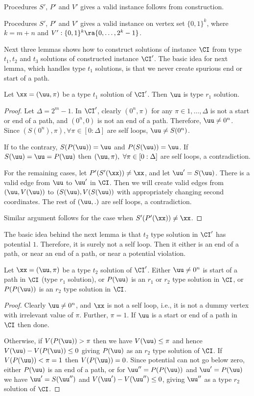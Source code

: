 Procedures $S'$, $P'$ and $V'$ gives a valid \EOML instance follows from construction.
\begin{lemma}\label{lem:p2m-valid}
Procedures $S'$, $P'$ and $V'$ gives a valid \EOML instance on vertex set $\{0,1\}^k$, where $k=m+n$ and $V':\{0,1\}^k\ra \{0,\dots, 2^k-1\}$.
\end{lemma}

Next three lemmas shows how to construct solutions of \EOPL instance $\CI$ from type $t_1, t_2$ and $t_3$ solutions of constructed \EOML instance $\CI'$.
The basic idea for next lemma, which handles type $t_1$ solutions, is that we never create spurious end or start of a path. 
\begin{lemma}\label{lem:p2m-t1}
Let $\xx=(\uu,\pi)$ be a type $t_1$ solution of $\CI'$. Then $\uu$ is type $r_1$ solution.
\end{lemma}
\begin{proof}
Let $\Delta=2^m-1$.
In $\CI'$, clearly $(0^n,\pi)$ for any $\pi \in {1,\dots, \Delta}$ is not a start or end of a path, and $(0^n,0)$ is not an end of a path. Therefore, $\uu\neq 0^n$. Since $(S(0^n),\pi), \forall \pi\in [0:\Delta]$ are self loops, $\uu \neq S(0^n)$.

If to the contrary, $S(P(\uu))=\uu$ and $P(S(\uu))=\uu$. If $S(\uu)=\uu=P(\uu)$ then $(\uu,\pi),\ \forall \pi\in[0:\Delta]$ are self loops, a contradiction. 

For the remaining cases, let $P'(S'(\xx))\neq \xx$, and let $\uu'=S(\uu)$. There is a valid edge from $\uu$ to $\uu'$ in $\CI$. Then we will create valid edges from $(\uu,V(\uu))$ to $(S(\uu),V(S(\uu))$ with appropriately changing second coordinates. The rest of $(\uu,.)$ are self loops, a contradiction. 

Similar argument follows for the case when $S'(P'(\xx))\neq \xx$. 
\end{proof}

The basic idea behind the next lemma is that $t_2$ type solution in $\CI'$ has potential $1$. Therefore, it is surely not a self loop. Then it either is an end of a path, or near an end of a path, or near a potential violation. 

\begin{lemma}\label{lem:p2m-t2}
Let $\xx=(\uu,\pi)$ be a type $t_2$ solution of $\CI'$. Either $\uu \neq 0^n$ is start of a path in $\CI$ (type $r_1$ solution), or $P(\uu)$ is an $r_1$ or $r_2$ type solution in $\CI$, or $P(P(\uu))$ is an $r_2$ type solution in $\CI$.
\end{lemma}
\begin{proof}
Clearly $\uu \neq 0^n$, and $\xx$ is not a self loop, i.e., it is not a dummy vertex with irrelevant value of $\pi$. Further, $\pi=1$. If $\uu$ is a start or end of a path in $\CI$ then done. 

Otherwise, if $V(P(\uu))>\pi$ then we have $V(\uu)\le \pi$ and hence $V(\uu)-V(P(\uu))\le 0$ giving $P(\uu)$ as an $r_2$ type solution of $\CI$. 
If $V(P(\uu))<\pi=1$ then $V(P(\uu))=0$. Since potential can not go below zero, either $P(\uu)$ is an end of a path, or for $\uu''=P(P(\uu))$ and $\uu'=P(\uu)$ we have $\uu'=S(\uu'')$ and $V(\uu')-V(\uu'')\le 0$, giving $\uu''$ as a type $r_2$ solution of $\CI$.
\end{proof}

